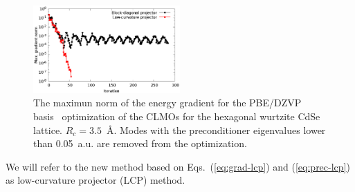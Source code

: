 \documentclass[aps,prl,twocolumn,reprint,amsmath,amssymb]{revtex4-1}
\begin{document}
\begin{figure}
\centering
\includegraphics[width=0.5\textwidth]{convergence}
\caption{The maximun norm of the energy gradient for the PBE/DZVP basis~\cite{vandevondele2007gaussian} optimization of the CLMOs for the hexagonal wurtzite CdSe lattice. $R_c = 3.5$~{\AA}. Modes with the preconditioner eigenvalues lower than 0.05~a.u. are removed from the optimization.} 
\label{fig:convergence}
\end{figure}

We will refer to the new method based on Eqs.~(\ref{eq:grad-lcp}) and (\ref{eq:prec-lcp}) as low-curvature projector (LCP) method.



\end{document}
